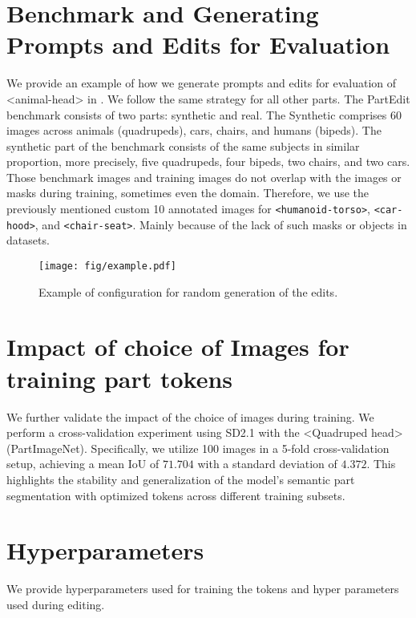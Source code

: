 \section{Benchmark and Generating Prompts and Edits for Evaluation}
\label{sec:benchmark_and_prompts}
We provide an example of how we generate prompts and edits for evaluation of <animal-head> in .
We follow the same strategy for all other parts.
The PartEdit benchmark consists of two parts: synthetic and real. The Synthetic comprises 60 images across animals (quadrupeds), cars, chairs, and humans (bipeds). The synthetic part of the benchmark consists of the same subjects in similar proportion, more precisely, five quadrupeds, four bipeds, two chairs, and two cars.
Those benchmark images and training images do not overlap with the images or masks during training, sometimes even the domain. Therefore, we use the previously mentioned custom 10 annotated images for
\texttt{<humanoid-torso>}, \texttt{<car-hood>}, and \texttt{<chair-seat>}. Mainly because of the lack of such masks or objects in datasets.   
\begin{figure*}
    \centering
    \texttt{[image: fig/example.pdf]}
    \caption{Example of configuration for random generation of the edits.}
    \label{fig:rand}
\end{figure*}



\section{Impact of choice of Images for training part tokens}
\label{sec:impact_selection_training_images}

We further validate the impact of the choice of images during training. We perform a cross-validation experiment using SD2.1 with the <Quadruped head> (PartImageNet). Specifically, we utilize 100 images in a 5-fold cross-validation setup, achieving a mean IoU of $71.704$ with a standard deviation of $4.372$. This highlights the stability and generalization of the model's semantic part segmentation with optimized tokens across different training subsets. 

\section{Hyperparameters}
We provide hyperparameters used for training the tokens and hyper parameters used during editing. 

